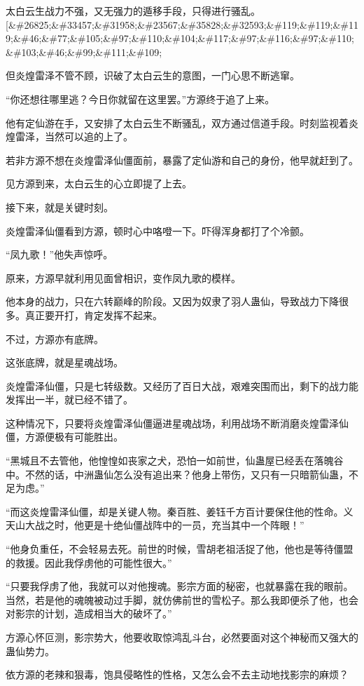 \begin{this_body}
太白云生战力不强，又无强力的遁移手段，只得进行骚乱。[\&\#26825;\&\#33457;\&\#31958;\&\#23567;\&\#35828;\&\#32593;\&\#119;\&\#119;\&\#119;\&\#46;\&\#77;\&\#105;\&\#97;\&\#110;\&\#104;\&\#117;\&\#97;\&\#116;\&\#97;\&\#110;\&\#103;\&\#46;\&\#99;\&\#111;\&\#109;

但炎煌雷泽不管不顾，识破了太白云生的意图，一门心思不断逃窜。

“你还想往哪里逃？今日你就留在这里罢。”方源终于追了上来。

他有定仙游在手，又安排了太白云生不断骚乱，双方通过信道手段。时刻监视着炎煌雷泽，当然可以追的上了。

若非方源不想在炎煌雷泽仙僵面前，暴露了定仙游和自己的身份，他早就赶到了。

见方源到来，太白云生的心立即提了上去。

接下来，就是关键时刻。

炎煌雷泽仙僵看到方源，顿时心中咯噔一下。吓得浑身都打了个冷颤。

“凤九歌！”他失声惊呼。

原来，方源早就利用见面曾相识，变作凤九歌的模样。

他本身的战力，只在六转巅峰的阶段。又因为奴隶了羽人蛊仙，导致战力下降很多。真正要开打，肯定发挥不起来。

不过，方源亦有底牌。

这张底牌，就是星魂战场。

炎煌雷泽仙僵，只是七转级数。又经历了百日大战，艰难突围而出，剩下的战力能发挥出一半，就已经不错了。

这种情况下，只要将炎煌雷泽仙僵逼进星魂战场，利用战场不断消磨炎煌雷泽仙僵，方源便极有可能胜出。

“黑城且不去管他，他惶惶如丧家之犬，恐怕一如前世，仙蛊屋已经丢在落魄谷中。不然的话，中洲蛊仙怎么没有追出来？他身上带伤，又只有一只暗箭仙蛊，不足为虑。”

“而这炎煌雷泽仙僵，却是关键人物。秦百胜、姜钰千方百计要保住他的性命。义天山大战之时，他更是十绝仙僵战阵中的一员，充当其中一个阵眼！”

“他身负重任，不会轻易去死。前世的时候，雪胡老祖活捉了他，他也是等待僵盟的救援。因此我俘虏他的可能性很大。”

“只要我俘虏了他，我就可以对他搜魂。影宗方面的秘密，也就暴露在我的眼前。当然，若是他的魂魄被动过手脚，就仿佛前世的雪松子。那么我即便杀了他，也会对影宗的计划，造成相当大的破坏了。”

方源心怀叵测，影宗势大，他要收取惊鸿乱斗台，必然要面对这个神秘而又强大的蛊仙势力。

依方源的老辣和狠毒，饱具侵略性的性格，又怎么会不去主动地找影宗的麻烦？


\end{this_body}
